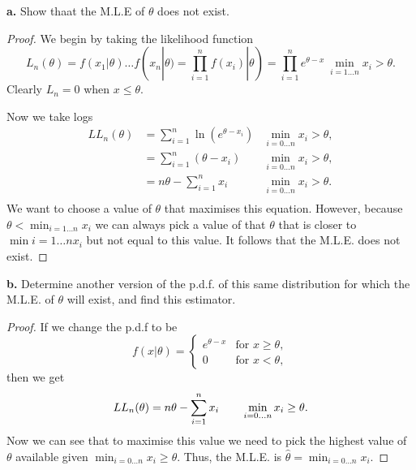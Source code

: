 \documentclass{article}
\begin{document}
\textbf{a.} Show thaat the M.L.E of $\theta$ does not exist.

\begin{proof}
    We begin by taking the likelihood function
    \begin{equation*}
        L_n(\theta) = f(x_1|\theta)\dots f(x_n|\theta)
        = \prod_{i=1}^n f(x_i)|\theta) = \prod_{i=1}^n e^{\theta - x} \
        \min_{i = 1\dots n} x_i > \theta.
    \end{equation*}
    Clearly $L_n = 0$ when $x \leq \theta$.

    Now we take logs
    \begin{align*}
        LL_n(\theta) & = \sum_{i=1}^n\ln(e^{\theta - x_i}) & \min_{i=0\dots n} x_i > \theta, \\
                     & = \sum_{i=1}^n (\theta - x_i)       & \min_{i=0\dots n} x_i > \theta, \\
                     & = n\theta - \sum_{i=1}^n x_i        & \min_{i=0\dots n} x_i > \theta. \\
    \end{align*}
    We want to choose a value of $\theta$ that maximises this equation. However, because
    $\theta < \min_{i=1\dots n} x_i$ we can always pick a value of that $\theta$
    that is closer to $\min{i=1\dots n} x_i$ but not equal to this value.
    It follows that the M.L.E. does not exist.
\end{proof}

\textbf{b.} Determine another version of the p.d.f. of this same distribution
for which the M.L.E. of $\theta$ will exist, and find this estimator.

\begin{proof}
    If we change the p.d.f to be
    \begin{equation*}
        f(x|\theta) = \begin{cases}
            e^{\theta - x} & \text{for } x \geq \theta, \\
            0              & \text{for } x < \theta,
        \end{cases}
    \end{equation*}
    then we get
    \begin{equation*}
        LL_n(\theta) = n\theta - \sum_{i=1}^n x_i  \qquad \min_{i=0\dots n} x_i \geq \theta. \\
    \end{equation*}
    Now we can see that to maximise this value we need to pick the highest value
    of $\theta$ available given $\min_{i=0\dots n} x_i \geq \theta$. Thus,
    the M.L.E. is $\hat{\theta} = \min_{i=0\dots n} x_i$.
\end{proof}
\end{document}
